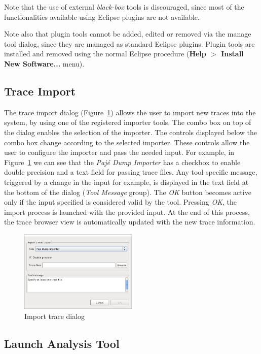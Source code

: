 \documentclass[twoside]{article}
\begin{document}
\begin{sloppypar}
Note that the use of external \emph{black-box} tools is discouraged, since most of the functionalities available using Eclipse plugins are not available.

Note also that plugin tools cannot be added, edited or removed via the manage tool dialog, since they are managed as standard Eclipse plugins.
Plugin tools are installed and removed using the normal Eclipse procedure (\textbf{Help $>$ Install New Software...} menu). 


\subsection{Trace Import}
\label{subsec:import}

The trace import dialog (Figure~\ref{fig:import_dialog}) allows the user to import new traces into the system, by using one of the registered importer tools.
The combo box on top of the dialog enables the selection of the importer.
The controls displayed below the combo box change according to the selected importer.
These controls allow the user to configure the importer and pass the needed input.
For example, in Figure~\ref{fig:import_dialog} we can see that the \emph{Pajé Dump Importer} has a checkbox to enable double precision and a text field for passing trace files.
Any tool specific message, triggered by a change in the input for example, is displayed in the text field at the bottom of the dialog (\emph{Tool Message} group).
The \emph{OK} button becomes active only if the input specified is considered valid by the tool. 
Pressing \emph{OK}, the import process is launched with the provided input.
At the end of this process, the trace browser view is automatically updated with the new trace information.

\begin{figure}[h!]
  \centering
    \includegraphics[width=0.5\textwidth]{images/import_dialog.png}
  \caption{Import trace dialog}
  \label{fig:import_dialog}
\end{figure}

\subsection{Launch Analysis Tool}
\label{subsec:analysis}


\end{sloppypar}
\end{document}
